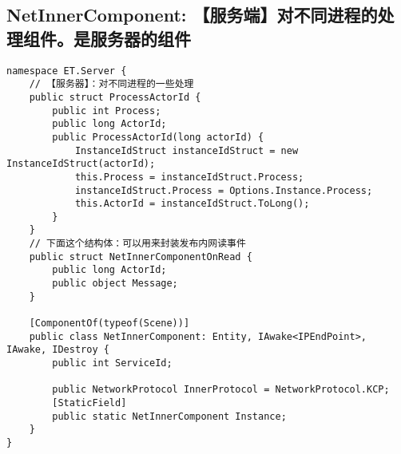 \documentclass[9pt, b5paper]{article}
\begin{document}
\subsection{NetInnerComponent: 【服务端】对不同进程的处理组件。是服务器的组件}
\label{sec-1-1}
\begin{verbatim}
namespace ET.Server {
    // 【服务器】：对不同进程的一些处理
    public struct ProcessActorId {
        public int Process;
        public long ActorId;
        public ProcessActorId(long actorId) {
            InstanceIdStruct instanceIdStruct = new InstanceIdStruct(actorId);
            this.Process = instanceIdStruct.Process;
            instanceIdStruct.Process = Options.Instance.Process;
            this.ActorId = instanceIdStruct.ToLong();
        }
    }
    // 下面这个结构体：可以用来封装发布内网读事件
    public struct NetInnerComponentOnRead {
        public long ActorId;
        public object Message;
    }
    
    [ComponentOf(typeof(Scene))]
    public class NetInnerComponent: Entity, IAwake<IPEndPoint>, IAwake, IDestroy {
        public int ServiceId;
        
        public NetworkProtocol InnerProtocol = NetworkProtocol.KCP;
        [StaticField]
        public static NetInnerComponent Instance;
    }
}
\end{verbatim}
\end{document}
